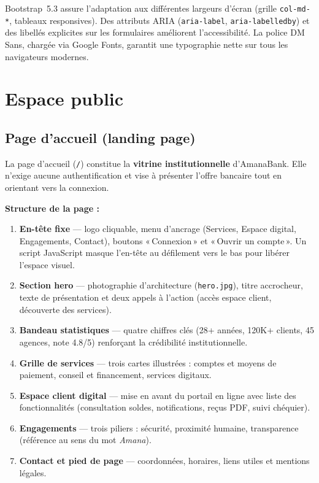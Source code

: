 Bootstrap~5.3 assure l'adaptation aux différentes largeurs d'écran (grille \texttt{col-md-*}, tableaux responsives). Des attributs ARIA (\texttt{aria-label}, \texttt{aria-labelledby}) et des libellés explicites sur les formulaires améliorent l'accessibilité. La police DM Sans, chargée via Google Fonts, garantit une typographie nette sur tous les navigateurs modernes.

\section{Espace public}

\subsection{Page d'accueil (landing page)}

La page d'accueil (\texttt{/}) constitue la \textbf{vitrine institutionnelle} d'AmanaBank. Elle n'exige aucune authentification et vise à présenter l'offre bancaire tout en orientant vers la connexion.

\textbf{Structure de la page :}
\begin{enumerate}[leftmargin=*]
    \item \textbf{En-tête fixe} — logo cliquable, menu d'ancrage (Services, Espace digital, Engagements, Contact), boutons «\,Connexion\,» et «\,Ouvrir un compte\,». Un script JavaScript masque l'en-tête au défilement vers le bas pour libérer l'espace visuel.
    \item \textbf{Section hero} — photographie d'architecture (\texttt{hero.jpg}), titre accrocheur, texte de présentation et deux appels à l'action (accès espace client, découverte des services).
    \item \textbf{Bandeau statistiques} — quatre chiffres clés (28+ années, 120K+ clients, 45 agences, note 4.8/5) renforçant la crédibilité institutionnelle.
    \item \textbf{Grille de services} — trois cartes illustrées : comptes et moyens de paiement, conseil et financement, services digitaux.
    \item \textbf{Espace client digital} — mise en avant du portail en ligne avec liste des fonctionnalités (consultation soldes, notifications, reçus PDF, suivi chéquier).
    \item \textbf{Engagements} — trois piliers : sécurité, proximité humaine, transparence (référence au sens du mot \emph{Amana}).
    \item \textbf{Contact et pied de page} — coordonnées, horaires, liens utiles et mentions légales.
\end{enumerate}

